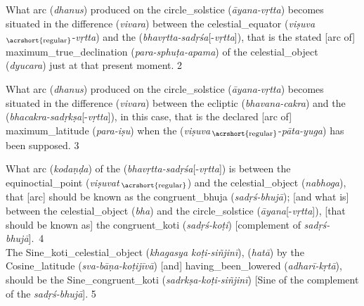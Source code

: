 \noindent\reversemarginpar{}%
What \gls{arc} (\textit{dhanus}) produced on the \gls{circle_solstice} (\textit{āyana-vṛtta}) becomes situated in the  \gls{difference} (\textit{vivara}) between the \gls{celestial_equator} (\textit{viṣuva}\,$_\text{\acrshort{regular}}$-\textit{vṛtta}) and the  (\textit{bhavṛtta-sadṛśa}[-\textit{vṛtta}]), that is the stated [arc of] \gls{maximum_true_declination} (\textit{para-sphuṭa-apama}) of the \gls{celestial_object} (\textit{dyucara}) just at that present moment. 2 
\medskip

\noindent\reversemarginpar{}%
What \gls{arc} (\textit{dhanus}) produced on the \gls{circle_solstice} (\textit{āyana-vṛtta}) becomes situated in the \gls{difference} (\textit{vivara}) between the \gls{ecliptic} (\textit{bhavana-cakra}) and the  (\textit{bhacakra-sadṛkṣa}[-\textit{vṛtta}]), in this case, that is the declared [arc of] \gls{maximum_latitude} (\textit{para-iṣu}) when the  (\textit{viṣuva}\,$_\text{\acrshort{regular}}$-\textit{pāta-yuga}) has been supposed. 3 
\medskip

\noindent\reversemarginpar{}%
What \gls{arc} (\textit{kodaṇḍa}) of the   (\textit{bhavṛtta-sadṛśa}[-\textit{vṛtta}]) is between the \gls{equinoctial_point} (\textit{viṣuvat}\,$_\text{\acrshort{regular}}$) and the \gls{celestial_object} (\textit{nabhoga}), that [arc] should be known as the \gls{congruent_bhuja} (\textit{sadṛś-bhujā}); [and what is] between the \gls{celestial_object} (\textit{bha}) and the \gls{circle_solstice} (\textit{āyana}[-\textit{vṛtta}]), [that should be known as] the \gls{congruent_koti} (\textit{sadṛś-koṭi}) [\ie complement of \textit{sadṛś-bhujā}].~4
\\[.65\baselineskip]

\noindent\reversemarginpar{}%
The \gls{Sine_koti_celestial_object} (\textit{khagasya koṭi-siñjinī}),  (\textit{hatā}) by the \gls{Cosine_latitude} (\textit{sva-bāṇa-koṭijīvā}) [and] \gls{having_been_lowered} (\textit{adharī-kṛtā}), should be the \gls{Sine_congruent_koti} (\textit{sadrkṣa-koṭi-siñjinī}) [\ie Sine of the complement of the \textit{sadṛś-bhujā}]. 5 
\medskip

